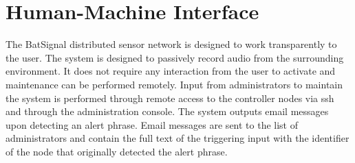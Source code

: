 \documentclass[11pt,a4paper]{article}
\begin{document}
\section{Human-Machine Interface}
The BatSignal distributed sensor network is designed to work transparently to the user. The system is designed to passively record audio from the surrounding environment. It does not require any interaction from the user to activate and maintenance can  be performed remotely. Input from administrators to maintain the system is performed through remote access to the controller nodes via ssh and through the administration console. The system outputs email messages upon detecting an alert phrase. Email messages are sent to the list of administrators and contain the full text of the triggering input with the identifier of the node that originally detected the alert phrase.
\end{document}
